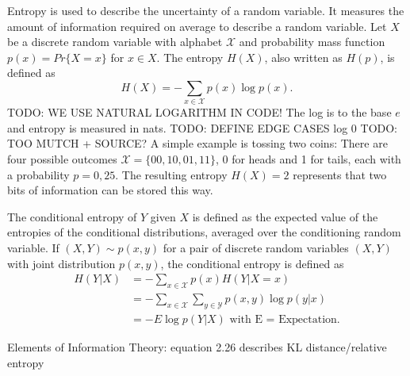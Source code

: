 Entropy is used to describe the uncertainty of a random variable. It measures the amount of information required on average to describe a random variable. Let $X$ be a discrete random variable with alphabet $\mathcal{X}$ and probability mass function $p(x)=Pr\{X=x\}$ for $x\in X$.
The entropy $H(X)$, also written as $H(p)$, is defined as
\begin{equation}
    H(X) = -\sum_{x \in \mathcal{X}} p(x) \log p(x).
\end{equation}
TODO: WE USE NATURAL LOGARITHM IN CODE! The log is to the base $e$ and entropy is measured in nats. TODO: DEFINE EDGE CASES log 0 TODO: TOO MUTCH + SOURCE? A simple example is tossing two coins: There are four possible outcomes $\mathcal{X}=\{00,10,01,11\}$, 0 for heads and 1 for tails, each with a probability $p=0,25$. The resulting entropy $H(X)=2$ represents that two bits of information can be stored this way. \bigskip

The conditional entropy of $Y$ given $X$ is defined as the expected value of the entropies of the conditional distributions, averaged over the conditioning random variable. If $(X,Y) \sim p(x,y)$ for a pair of discrete random variables $(X,Y)$ with joint distribution $p(x,y)$, the conditional entropy is defined as \\
\begin{align}
    H(Y|X)&= -\sum_{x \in \mathcal{X}} p(x) H(Y|X=x) \\
    &= - \sum_{x \in \mathcal{X}} \sum_{y \in \mathcal{Y}}p(x,y) \log p(y|x) \\
    &= -E \log p(Y|X) \text{ with E = Expectation}.
\end{align}

Elements of Information Theory: equation 2.26 describes KL distance/relative entropy \bigskip

